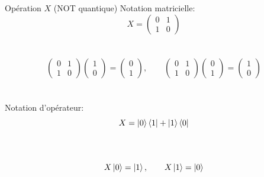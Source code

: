 \documentclass[aspectratio=169,12pt]{beamer}
\begin{document}
\begin{frame}{Opération $X$ (NOT quantique)}
  Notation matricielle:
  $$
    X = \begin{pmatrix}0 & 1 \\ 1 & 0\end{pmatrix}
  $$\\~\\
  $$
    \begin{pmatrix}0 & 1 \\ 1 & 0\end{pmatrix}
    \begin{pmatrix}1\\0\end{pmatrix}=
    \begin{pmatrix}0\\1\end{pmatrix},
    \qquad
    \begin{pmatrix}0 & 1 \\ 1 & 0\end{pmatrix}
    \begin{pmatrix}0\\1\end{pmatrix}=
    \begin{pmatrix}1\\0\end{pmatrix}
  $$
  ~\\~\\
  Notation d'opérateur: $$X = \ket 0 \bra 1 + \ket 1 \bra 0$$\\~\\
  $$
    X\ket 0 = \ket 1, \qquad
    X\ket 1 = \ket 0
  $$
  
\end{frame}
\end{document}
